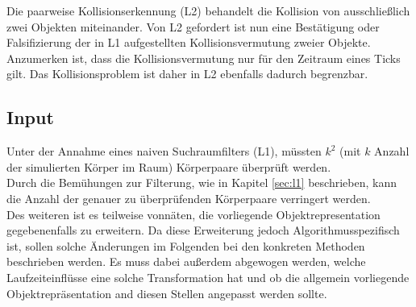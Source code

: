 Die paarweise Kollisionserkennung (L2) behandelt die Kollision von ausschließlich zwei Objekten miteinander. Von L2 gefordert ist nun eine Bestätigung oder Falsifizierung der in L1 aufgestellten Kollisionsvermutung zweier Objekte.\\
Anzumerken ist, dass die Kollisionsvermutung nur für den Zeitraum eines Ticks gilt. Das Kollisionsproblem ist daher in L2 ebenfalls dadurch begrenzbar.


\subsection{Input}
Unter der Annahme eines naiven Suchraumfilters (L1), müssten $k^2$ (mit $k$ Anzahl der simulierten Körper im Raum) Körperpaare überprüft werden.\\
Durch die Bemühungen zur Filterung, wie in Kapitel \ref{sec:l1}
 beschrieben, kann die Anzahl der genauer zu überprüfenden Körperpaare verringert werden.\\
 
Des weiteren ist es teilweise vonnäten, die vorliegende Objektrepresentation gegebenenfalls zu erweitern. Da diese Erweiterung jedoch Algorithmusspezifisch ist, sollen solche Änderungen im Folgenden bei den konkreten Methoden beschrieben werden. Es muss dabei außerdem abgewogen werden, welche Laufzeiteinflüsse eine solche Transformation hat und ob die allgemein vorliegende Objektrepräsentation and diesen Stellen angepasst werden sollte.


